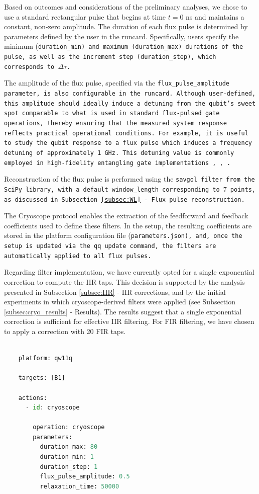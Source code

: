Based on outcomes and considerations of the preliminary analyses, we chose to use a standard rectangular pulse that begins at time $t = 0$ ns and maintains a constant, non-zero amplitude. 
The duration of each flux pulse is determined by parameters defined by the user in the runcard. 
Specifically, users specify the minimum (\tt{duration\_min}) and maximum (\tt{duration\_max}) durations of the pulse, as well as the increment step (\tt{duration\_step}), which corresponds to $\Delta\tau$.

The amplitude of the flux pulse, specified via the \tt{flux\_pulse\_amplitude} parameter, is also configurable in the runcard. 
Although user-defined, this amplitude should ideally induce a detuning from the qubit's sweet spot comparable to what is used in standard flux-pulsed gate operations, thereby ensuring that the measured system response reflects practical operational conditions.
For example, it is useful to study the qubit response to a flux pulse which induces a frequency detuning of approximately 1 GHz. 
This detuning value is commonly employed in high-fidelity entangling gate implementations \cite{Langford2017}, \cite{Bultink_2020}, \cite{Rol2019iju}.

Reconstruction of the flux pulse is performed using the \tt{savgol} filter from the SciPy library, with a default \tt{window\_length} corresponding to $7$ points, as discussed in Subsection \ref{subsec:WL} - Flux pulse reconstruction.

The Cryoscope protocol enables the extraction of the feedforward and feedback coefficients used to define these filters. 
In the \Qibo setup, the resulting coefficients are stored in the platform configuration file (\tt{parameters.json}), and, once the setup is updated via the \texttt{qq update} command, the filters are automatically applied to all flux pulses.

Regarding filter implementation, we have currently opted for a single exponential correction to compute the IIR taps. 
This decision is supported by the analysis presented in Subsection \ref{subsec:IIR} - IIR corrections, and by the initial experiments in which cryoscope-derived filters were applied (see Subsection \ref{subsec:cryo_results} - Results). 
The results suggest that a single exponential correction is sufficient for effective IIR filtering. 
For FIR filtering, we have chosen to apply a correction with 20 FIR taps.

\begin{lstlisting}[language=Python, caption={Runcard example to run a Cryoscope experiment.}, label={snippet:cryoscope}]
    
    platform: qw11q

    targets: [B1]

    actions:
      - id: cryoscope 

        operation: cryoscope 
        parameters:
          duration_max: 80
          duration_min: 1
          duration_step: 1
          flux_pulse_amplitude: 0.5
          relaxation_time: 50000

\end{lstlisting}



